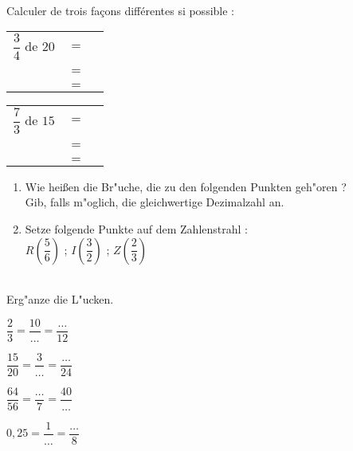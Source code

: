 \\
Calculer de trois fa\c{c}ons diff\'erentes si possible :
\begin{multicols}{2}
\begin{tabular}{llp{7cm}}
$\dfrac{3}{4}$ de $20$&$=$&\dotfill\\
&&\\
&$=$&\dotfill\\
&&\\
&$=$&\dotfill\\
\end{tabular}

\columnbreak

\begin{tabular}{llp{7cm}}
$\dfrac{7}{3}$ de $15$&$=$&\dotfill\\
&&\\
&$=$&\dotfill\\
&&\\
&$=$&\dotfill\\
\end{tabular}
\end{multicols}

\begin{multicols}{2}
\begin{enumerate}
\item Wie hei\ss en die Br"uche, die zu den folgenden Punkten geh"oren ?\\
  Gib, falls m"oglich, die gleichwertige Dezimalzahl an.
  
      \begin{DroiteGraduee}[none]{8}{0}{13}{1}{1}{0}{0}
\end{DroiteGraduee}

\columnbreak
\item Setze folgende Punkte auf dem Zahlenstrahl : \\
$R(\dfrac{5}{6})$ ; $I(\dfrac{3}{2})$ ; $Z(\dfrac{2}{3})$

\begin{DroiteGraduee}[none]{8}{0}{13}{1}{1}{0}{0}
\end{DroiteGraduee}

\end{enumerate}
\end{multicols}

\\
Erg"anze die L"ucken.\\
\begin{multicols}{4}
$\dfrac{2}{3}=\dfrac{10}{\ldots}=\dfrac{\ldots}{12}$

\columnbreak

$\dfrac{15}{20}=\dfrac{3}{\ldots}=\dfrac{\ldots}{24}$
\columnbreak

$\dfrac{64}{56}=\dfrac{\ldots}{7}=\dfrac{40}{\ldots}$

\columnbreak

$0,25=\dfrac{1}{\ldots}=\dfrac{\ldots}{8}$

\end{multicols}

